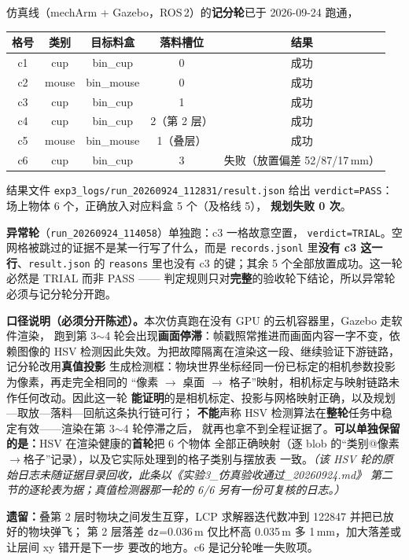 \documentclass[12pt,a4paper]{ctexart}
\begin{document}
仿真线（mechArm + Gazebo，ROS\,2）的\textbf{记分轮}已于 2026-09-24 跑通，
\begin{center}
\begin{tabular}{@{}ccccc@{}}
\toprule
格号 & 类别 & 目标料盒 & 落料槽位 & 结果 \\
\midrule
c1 & cup   & bin\_cup   & 0 & 成功 \\
c2 & mouse & bin\_mouse & 0 & 成功 \\
c3 & cup   & bin\_cup   & 1 & 成功 \\
c4 & cup   & bin\_cup   & 2（第 2 层） & 成功 \\
c5 & mouse & bin\_mouse & 1（叠层） & 成功 \\
c6 & cup   & bin\_cup   & 3 & 失败（放置偏差 52/87/17\,mm） \\
\bottomrule
\end{tabular}
\end{center}
结果文件 \texttt{exp3\_logs/run\_20260924\_112831/result.json} 给出
\texttt{verdict=PASS}：场上物体 6 个，正确放入对应料盒 5 个（及格线 5），
\textbf{规划失败 0 次}。

\textbf{异常轮}（\texttt{run\_20260924\_114058}）单独跑：c3 一格故意空置，
\texttt{verdict=TRIAL}。空网格被跳过的证据不是某一行写了什么，而是
\texttt{records.jsonl} 里\textbf{没有 c3 这一行}、\texttt{result.json} 的
\texttt{reasons} 里也没有 c3 的键；其余 5 个全部放置成功。这一轮必然是 TRIAL 而非
PASS —— 判定规则只对\textbf{完整}的验收轮下结论，所以异常轮必须与记分轮分开跑。

\textbf{口径说明（必须分开陈述）。}本次仿真跑在没有 GPU 的云机容器里，Gazebo 走软件渲染，
跑到第 3$\sim$4 轮会出现\textbf{画面停滞}：帧戳照常推进而画面内容一字不变，依赖图像的
HSV 检测因此失效。为把故障隔离在渲染这一段、继续验证下游链路，记分轮改用\textbf{真值投影}
生成检测框：物块世界坐标经同一份已标定的相机参数投影为像素，再走完全相同的
“像素 $\to$ 桌面 $\to$ 格子”映射，相机标定与映射链路未作任何改动。因此这一轮
\textbf{能证明}的是相机标定、投影与网格映射正确，以及规划—取放—落料—回航这条执行链可行；
\textbf{不能}声称 HSV 检测算法在\textbf{整轮}任务中稳定有效——渲染在第 3$\sim$4 轮停滞之后，
就再也拿不到全程证据了。\textbf{可以单独保留的是：}HSV 在渲染健康的\textbf{首轮}把 6 个物体
全部正确映射（逐 blob 的“类别@像素$\to$格子”记录），以及它实际处理到的格子类别与摆放表
一致。\textit{（该 HSV 轮的原始日志未随证据目录回收，此条以《实验3\_仿真验收通过\_20260924.md》
第二节的逐轮表为据；真值检测器那一轮的 6/6 另有一份可复核的日志。）}

\textbf{遗留：}叠第 2 层时物块之间发生互穿，LCP 求解器迭代数冲到 122847 并把已放好的物块弹飞；
第 2 层落差 \texttt{dz}=0.036\,m 仅比杯高 0.035\,m 多 1\,mm，加大落差或让层间 xy 错开是下一步
要改的地方。c6 是记分轮唯一失败项。
\end{document}
